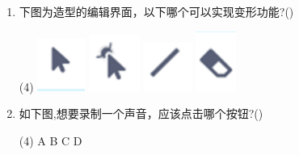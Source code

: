 \documentclass[10pt, a4paper]{article}
\begin{document}
\begin{enumerate}
        \item 下图为造型的编辑界面，以下哪个可以实现变形功能?(\qquad)
        \begin{tasks}(4)
            \task \includegraphics[width=.03\textwidth]{14a.png}
            \task \includegraphics[width=.03\textwidth]{14b.png}
            \task \includegraphics[width=.03\textwidth]{14c.png}
            \task \includegraphics[width=.03\textwidth]{14d.png}
        \end{tasks}
    
        \item 如下图,想要录制一个声音，应该点击哪个按钮?(\qquad)
        \begin{tasks}(4)
            \task A
            \task B
            \task C
            \task D
        \end{tasks}


\end{enumerate}
\end{document}
